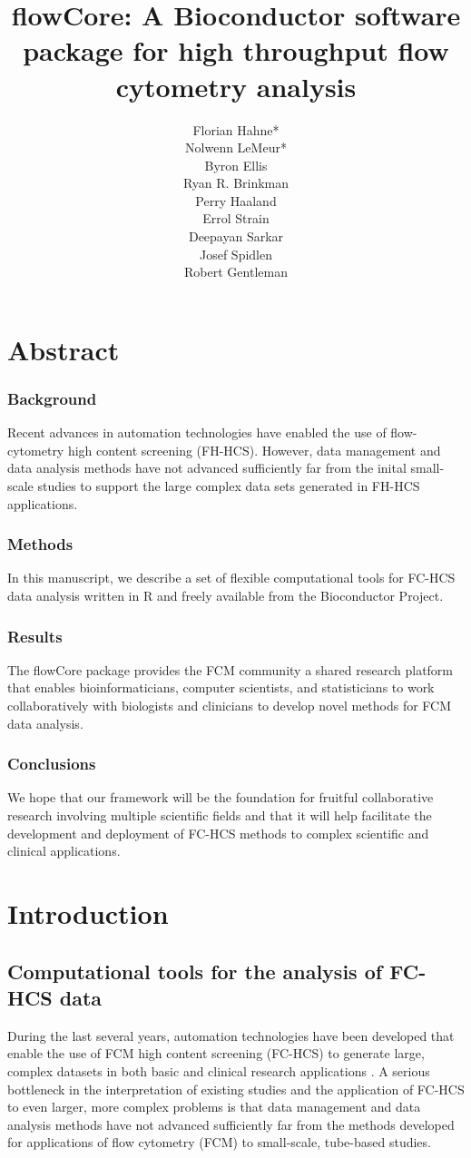 \documentclass[12pt]{article}
\title{flowCore: A Bioconductor software package for high throughput flow cytometry analysis}
\author{Florian Hahne*\\
  Nolwenn LeMeur*\\
  Byron Ellis\\
  Ryan R. Brinkman\\
  Perry Haaland\\
  Errol Strain\\
  Deepayan Sarkar\\
  Josef Spidlen\\
  Robert Gentleman
 }
\newcommand{\Rpackage}[1]{{\textsf{#1}}}
\begin{document}
\maketitle

\section*{Abstract}
\subsubsection*{Background}
Recent advances in automation technologies have enabled the use of
flow-cytometry high content screening (FH-HCS). However, data
management and data analysis methods have not advanced sufficiently
far from the inital small-scale studies to support the large complex
data sets generated in FH-HCS applications.
\subsubsection*{Methods}
In this manuscript, we describe a set of flexible
computational tools for FC-HCS data analysis written 
in R and freely available from the Bioconductor Project.

\subsubsection*{Results}
The \Rpackage{flowCore} package provides the FCM community a shared
research platform that enables bioinformaticians, computer scientists,
and statisticians to work collaboratively with biologists and
clinicians to develop novel methods for FCM data analysis.
\subsubsection*{Conclusions}
We hope that our framework will be the foundation for fruitful 
collaborative research involving multiple scientific fields and
that it will help facilitate the
development and deployment of FC-HCS methods to complex 
scientific and clinical applications.

\section*{Introduction}
\subsection*{Computational tools for the analysis of FC-HCS data}
During the last several years, automation technologies have been
developed that enable the use of FCM high content screening
(FC-HCS) to generate large, complex datasets in both basic and
clinical research applications \citep{brinkman2007hcf}. A serious
bottleneck in the interpretation of existing studies and the
application of FC-HCS to even larger, more complex problems is that
data management and data analysis methods have not advanced
sufficiently far from the methods developed for applications of flow
cytometry (FCM) to small-scale, tube-based studies.
\end{document}
